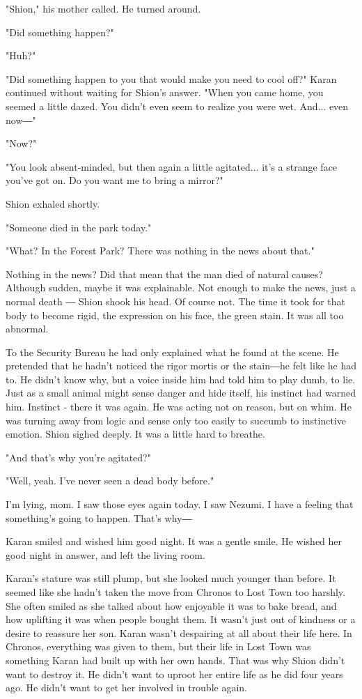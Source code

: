 "Shion," his mother called. He turned around.

"Did something happen?"

"Huh?"

"Did something happen to you that would make you need to cool off?"
Karan continued without waiting for Shion's answer. "When you came home,
you seemed a little dazed. You didn't even seem to realize you were wet.
And... even now―"

"Now?"

"You look absent-minded, but then again a little agitated... it's a
strange face you've got on. Do you want me to bring a mirror?"

Shion exhaled shortly.

"Someone died in the park today."

"What? In the Forest Park? There was nothing in the news about that."

Nothing in the news? Did that mean that the man died of natural causes?
Although sudden, maybe it was explainable. Not enough to make the news,
just a normal death ― Shion shook his head. Of course not. The time it
took for that body to become rigid, the expression on his face, the
green stain. It was all too abnormal.

To the Security Bureau he had only explained what he found at the scene.
He pretended that he hadn't noticed the rigor mortis or the stain―he
felt like he had to. He didn't know why, but a voice inside him had told
him to play dumb, to lie. Just as a small animal might sense danger and
hide itself, his instinct had warned him. Instinct - there it was again.
He was acting not on reason, but on whim. He was turning away from logic
and sense only too easily to succumb to instinctive emotion. Shion
sighed deeply. It was a little hard to breathe.

"And that's why you're agitated?"

"Well, yeah. I've never seen a dead body before."

I'm lying, mom. I saw those eyes again today. I saw Nezumi. I have a
feeling that something's going to happen. That's why―

Karan smiled and wished him good night. It was a gentle smile. He wished
her good night in answer, and left the living room.

Karan's stature was still plump, but she looked much younger than
before. It seemed like she hadn't taken the move from Chronos to Lost
Town too harshly. She often smiled as she talked about how enjoyable it
was to bake bread, and how uplifting it was when people bought them. It
wasn't just out of kindness or a desire to reassure her son. Karan
wasn't despairing at all about their life here. In Chronos, everything
was given to them, but their life in Lost Town was something Karan had
built up with her own hands. That was why Shion didn't want to destroy
it. He didn't want to uproot her entire life as he did four years ago.
He didn't want to get her involved in trouble again.

